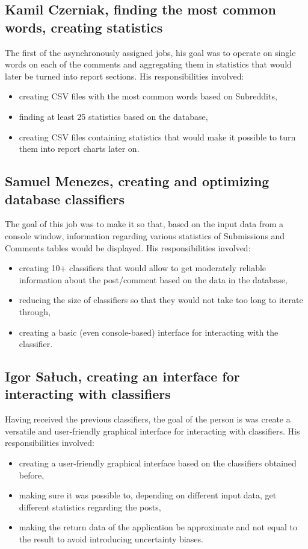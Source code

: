 \documentclass{article}
\begin{document}
\subsection{Kamil Czerniak, finding the most common words, creating statistics}
The first of the asynchronously assigned jobs, his goal was to operate on single words on each of the comments and aggregating them in statistics that would later be turned into report sections. His responsibilities involved:
\begin{itemize}
	\item creating CSV files with the most common words based on Subreddits,
	\item finding at least 25 statistics based on the database,
	\item creating CSV files containing statistics that would make it possible to turn them into report charts later on.
\end{itemize}

\subsection{Samuel Menezes, creating and optimizing database classifiers}
The goal of this job was to make it so that, based on the input data from a console window, information regarding various statistics of Submissions and Comments tables would be displayed. His responsibilities involved:
\begin{itemize}
	\item creating 10+ classifiers that would allow to get moderately reliable information about the post/comment based on the data in the database,
	\item reducing the size of classifiers so that they would not take too long to iterate through,
	\item creating a basic (even console-based) interface for interacting with the classifier.
\end{itemize}

\subsection{Igor Sałuch, creating an interface for interacting with classifiers}
Having received the previous classifiers, the goal of the person is was create a versatile and user-friendly graphical interface for interacting with classifiers. His responsibilities involved:
\begin{itemize}
	\item creating a user-friendly graphical interface based on the classifiers obtained before,
	\item making sure it was possible to, depending on different input data, get different statistics regarding the posts,
	\item making the return data of the application be approximate and not equal to the result to avoid introducing uncertainty biases.
\end{itemize}
\end{document}

